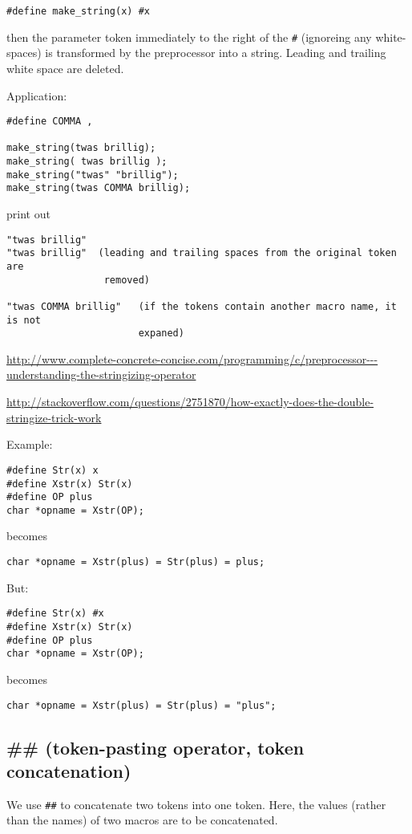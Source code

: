\begin{verbatim}
#define make_string(x) #x
\end{verbatim}
then the parameter token immediately to the right of the \verb!#! (ignoreing
any white-spaces) is transformed by the preprocessor into a string.
Leading and trailing white space are deleted.

Application:
\begin{verbatim}
#define COMMA ,

make_string(twas brillig);
make_string( twas brillig );
make_string("twas" "brillig");
make_string(twas COMMA brillig);
\end{verbatim}
print out
\begin{verbatim}
"twas brillig"
"twas brillig"  (leading and trailing spaces from the original token are
                 removed)

"twas COMMA brillig"   (if the tokens contain another macro name, it is not
                       expaned)
\end{verbatim}

\url{http://www.complete-concrete-concise.com/programming/c/preprocessor---understanding-the-stringizing-operator}

\url{http://stackoverflow.com/questions/2751870/how-exactly-does-the-double-stringize-trick-work}

 Example:
\begin{verbatim}
#define Str(x) x
#define Xstr(x) Str(x)
#define OP plus
char *opname = Xstr(OP);
\end{verbatim}
becomes
\begin{verbatim}
char *opname = Xstr(plus) = Str(plus) = plus;
\end{verbatim}

But:
\begin{verbatim}
#define Str(x) #x
#define Xstr(x) Str(x)
#define OP plus
char *opname = Xstr(OP);
\end{verbatim}
becomes
\begin{verbatim}
char *opname = Xstr(plus) = Str(plus) = "plus";
\end{verbatim}


\subsection{\#\# (token-pasting operator, token concatenation)}

We use \verb!##! to concatenate two tokens into one token.
Here, the values (rather than the names) of two macros are to be concatenated.

